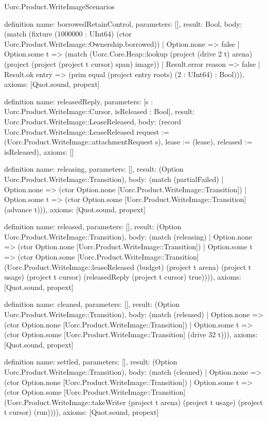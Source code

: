 \begin{lexlean}{Uorc.Product.WriteImageScenarios}
\begin{semanticmodule}
definition{
  name: borrowedRetainControl,
  parameters: [],
  result: Bool,
  body: (match (fixture (1000000 : UInt64) (ctor Uorc.Product.WriteImage::Ownership.borrowed))
    | Option.none => false
    | Option.some t => (match (Uorc.Core.Heap::lookup (project (drive 2 t) arena) (project (project (project t cursor) span) image))
      | Result.error reason => false
      | Result.ok entry => (prim equal (project entry roots) (2 : UInt64) : Bool))),
  axioms: [Quot.sound, propext]
}

definition{
  name: releasedReply,
  parameters: [s : Uorc.Product.WriteImage::Cursor, isReleased : Bool],
  result: Uorc.Product.WriteImage::LeaseReleased,
  body: (record Uorc.Product.WriteImage::LeaseReleased {request := (Uorc.Product.WriteImage::attachmentRequest s), lease := (lease), released := isReleased}),
  axioms: []
}

definition{
  name: releasing,
  parameters: [],
  result: (Option Uorc.Product.WriteImage::Transition),
  body: (match (partialFailed)
    | Option.none => (ctor Option.none [Uorc.Product.WriteImage::Transition])
    | Option.some t => (ctor Option.some [Uorc.Product.WriteImage::Transition] (advance t))),
  axioms: [Quot.sound, propext]
}

definition{
  name: released,
  parameters: [],
  result: (Option Uorc.Product.WriteImage::Transition),
  body: (match (releasing)
    | Option.none => (ctor Option.none [Uorc.Product.WriteImage::Transition])
    | Option.some t => (ctor Option.some [Uorc.Product.WriteImage::Transition] (Uorc.Product.WriteImage::leaseReleased (budget) (project t arena) (project t usage) (project t cursor) (releasedReply (project t cursor) true)))),
  axioms: [Quot.sound, propext]
}

definition{
  name: cleaned,
  parameters: [],
  result: (Option Uorc.Product.WriteImage::Transition),
  body: (match (released)
    | Option.none => (ctor Option.none [Uorc.Product.WriteImage::Transition])
    | Option.some t => (ctor Option.some [Uorc.Product.WriteImage::Transition] (drive 32 t))),
  axioms: [Quot.sound, propext]
}

definition{
  name: settled,
  parameters: [],
  result: (Option Uorc.Product.WriteImage::Transition),
  body: (match (cleaned)
    | Option.none => (ctor Option.none [Uorc.Product.WriteImage::Transition])
    | Option.some t => (ctor Option.some [Uorc.Product.WriteImage::Transition] (Uorc.Product.WriteImage::takeWriter (project t arena) (project t usage) (project t cursor) (run)))),
  axioms: [Quot.sound, propext]
}


\end{semanticmodule}
\end{lexlean}
